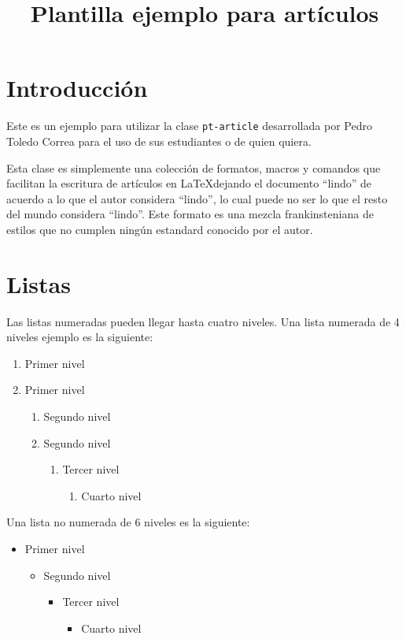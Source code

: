 \documentclass[letterpaper]{pt-article}
\title{Plantilla ejemplo para artículos}
\begin{document}
\tableofcontents
\listoffigures
\listoftables
\templaterule

\section{Introducción}

Este es un ejemplo para utilizar la clase \texttt{pt-article} desarrollada por Pedro Toledo Correa para el uso de sus estudiantes o de quien quiera.

Esta clase es simplemente una colección de formatos, macros y comandos que facilitan la escritura de artículos en \LaTeX dejando el documento ``lindo'' de acuerdo a lo que el autor considera ``lindo'', lo cual puede no ser lo que el resto del mundo considera ``lindo''. Este formato es una mezcla frankinsteniana de estilos que no cumplen ningún estandard conocido por el autor.

\section{Listas}

Las listas numeradas pueden llegar hasta cuatro niveles. Una lista numerada de 4 niveles ejemplo es la siguiente:

\begin{enumerate}
  \item Primer nivel
  \item Primer nivel
  \begin{enumerate}
    \item Segundo nivel
    \item Segundo nivel
    \begin{enumerate}
      \item Tercer nivel
      \begin{enumerate}
        \item Cuarto nivel
      \end{enumerate}
    \end{enumerate}
  \end{enumerate}
\end{enumerate}

Una lista no numerada de 6 niveles es la siguiente:

\begin{itemize}
 \item Primer nivel
 \begin{itemize}
  \item Segundo nivel
  \begin{itemize}
   \item Tercer nivel
   \begin{itemize}
    \item Cuarto nivel
   \end{itemize}
  \end{itemize}
 \end{itemize}
\end{itemize}
\end{document}
